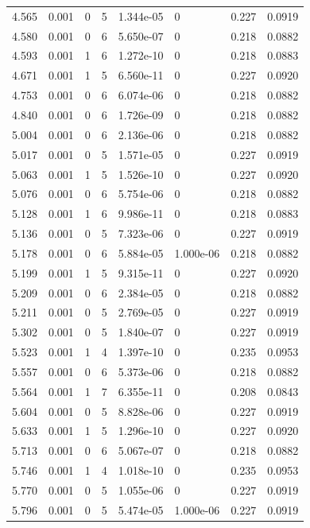 \documentclass[preview]{standalone}
\begin{document}
{{{\begin{tabular}{L{1.2cm}C{1.2cm} C{0.3cm}C{0.5cm} C{1.4cm}C{1.4cm} C{1.4cm}C{1.4cm}}
  4.565  &  0.001  & 0     &  5 &  1.344e-05  & 0  & 0.227 &  0.0919   \\ 
  4.580  &  0.001  & 0     &  6 &  5.650e-07  & 0  & 0.218 &  0.0882   \\ 
  4.593  &  0.001  & 1     &  6 &  1.272e-10  & 0  & 0.218 &  0.0883   \\ 
  4.671  &  0.001  & 1     &  5 &  6.560e-11  & 0  & 0.227 &  0.0920   \\ 
  4.753  &  0.001  & 0     &  6 &  6.074e-06  & 0  & 0.218 &  0.0882   \\ 
  4.840  &  0.001  & 0     &  6 &  1.726e-09  & 0  & 0.218 &  0.0882   \\ 
  5.004  &  0.001  & 0     &  6 &  2.136e-06  & 0  & 0.218 &  0.0882   \\ 
  5.017  &  0.001  & 0     &  5 &  1.571e-05  & 0  & 0.227 &  0.0919   \\ 
  5.063  &  0.001  & 1     &  5 &  1.526e-10  & 0  & 0.227 &  0.0920   \\ 
  5.076  &  0.001  & 0     &  6 &  5.754e-06  & 0  & 0.218 &  0.0882   \\ 
  5.128  &  0.001  & 1     &  6 &  9.986e-11  & 0  & 0.218 &  0.0883   \\ 
  5.136  &  0.001  & 0     &  5 &  7.323e-06  & 0  & 0.227 &  0.0919   \\ 
  5.178  &  0.001  & 0     &  6 &  5.884e-05  & 1.000e-06  & 0.218 &  0.0882   \\ 
  5.199  &  0.001  & 1     &  5 &  9.315e-11  & 0  & 0.227 &  0.0920   \\ 
  5.209  &  0.001  & 0     &  6 &  2.384e-05  & 0  & 0.218 &  0.0882   \\ 
  5.211  &  0.001  & 0     &  5 &  2.769e-05  & 0  & 0.227 &  0.0919   \\ 
  5.302  &  0.001  & 0     &  5 &  1.840e-07  & 0  & 0.227 &  0.0919   \\ 
  5.523  &  0.001  & 1     &  4 &  1.397e-10  & 0  & 0.235 &  0.0953   \\ 
  5.557  &  0.001  & 0     &  6 &  5.373e-06  & 0  & 0.218 &  0.0882   \\ 
  5.564  &  0.001  & 1     &  7 &  6.355e-11  & 0  & 0.208 &  0.0843   \\ 
  5.604  &  0.001  & 0     &  5 &  8.828e-06  & 0  & 0.227 &  0.0919   \\ 
  5.633  &  0.001  & 1     &  5 &  1.296e-10  & 0  & 0.227 &  0.0920   \\ 
  5.713  &  0.001  & 0     &  6 &  5.067e-07  & 0  & 0.218 &  0.0882   \\ 
  5.746  &  0.001  & 1     &  4 &  1.018e-10  & 0  & 0.235 &  0.0953   \\ 
  5.770  &  0.001  & 0     &  5 &  1.055e-06  & 0  & 0.227 &  0.0919   \\ 
  5.796  &  0.001  & 0     &  5 &  5.474e-05  & 1.000e-06  & 0.227 &  0.0919   \\ 
\hline 
\end{tabular} 

}}}
\end{document}
